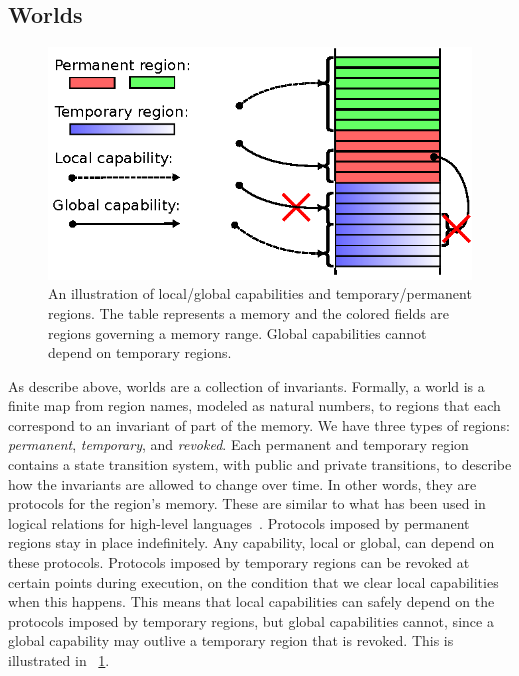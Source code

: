 \documentclass[acmsmall,review]{acmart}\settopmatter{printfolios=true}
\newcommand\lau[1]{{\color{purple} \sf \footnotesize {LS: #1}}\\}
\newcommand\dominique[1]{{\color{purple} \sf \footnotesize {DD: #1}}\\}
\newcommand{\plainview}[1]{\mathrm{#1}}
\newcommand{\perma}{\plainview{perm}}
\newcommand{\temp}{\plainview{temp}}
\newcommand{\revoked}{\plainview{revoked}}
\begin{document}
\subsection{Worlds}
\begin{figure}
  \centering
  \includegraphics{w11}
  \caption{An illustration of local/global capabilities and temporary/permanent
    regions. The table represents a memory and the colored fields are regions
    governing a memory range. Global capabilities cannot depend on temporary
    regions.}
  \label{fig:cap-world}
\end{figure}

As describe above, worlds are a collection of invariants. Formally, a world is a
finite map from region names, modeled as natural numbers, to regions that each
correspond to an invariant of part of the memory.  We have three types of
regions: \emph{permanent}, \emph{temporary}, and \emph{revoked}.
Each permanent and temporary region contains a state transition system, with
public and private transitions, to describe how the invariants are allowed to
change over time. In other words, they are protocols for the region's
memory. These are similar to what has been used in logical relations for
high-level
languages~\citep{Ahmed:popl09,Dreyer:jfp12,Devriese:2016ObjCap}. Protocols
imposed by permanent regions stay in place indefinitely. Any capability, local
or global, can depend on these protocols. Protocols imposed by temporary regions
can be revoked at certain points during execution, on the condition that we
clear local capabilities when this happens. This means that local capabilities
can safely depend on the protocols imposed by temporary regions, but global
capabilities cannot, since a global capability may outlive a temporary region
that is revoked. This is illustrated in \figurename~\ref{fig:cap-world}.
\end{document}
